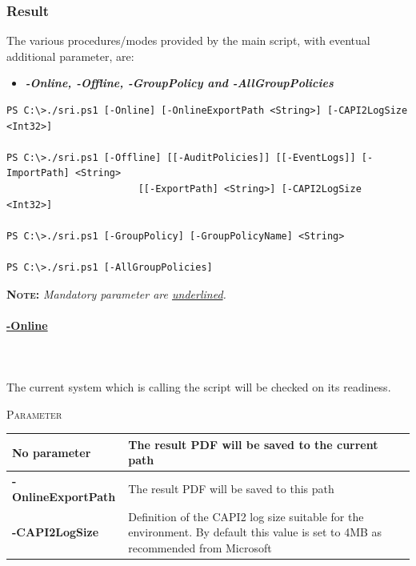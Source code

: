 \subsubsection{Result}
The various procedures/modes provided by the main script, with eventual additional parameter, are:
\begin{itemize}
    \item \textbf{\textit{-Online, -Offline, -GroupPolicy and -AllGroupPolicies}}
\end{itemize}
\begin{lstlisting}[caption=SRI Main Script Parameter Combinations]
PS C:\>./sri.ps1 [-Online] [-OnlineExportPath <String>] [-CAPI2LogSize <Int32>]

PS C:\>./sri.ps1 [-Offline] [[-AuditPolicies]] [[-EventLogs]] [-ImportPath] <String> 
                       [[-ExportPath] <String>] [-CAPI2LogSize <Int32>]

PS C:\>./sri.ps1 [-GroupPolicy] [-GroupPolicyName] <String>

PS C:\>./sri.ps1 [-AllGroupPolicies]
\end{lstlisting}
\vspace{0.5cm}
\textsc{\textbf{Note:}}\textit{ Mandatory parameter are \underline{underlined}.}
\vspace{0.5cm}
\begin{tcolorbox}
    \paragraph{\underline{-Online}} \ \\\\
    The current system which is calling the script will be checked on its readiness.
    \vspace{0.3cm}
    \begin{center}
        \textsc{Parameter}
    \end{center}
    \vspace{-0.5cm}
    \begin{table}[H]
        \def\arraystretch{2}
        \centering
        \begin{tabular}{ p{4cm}  p{10cm} }  \hline
            \textbf{No parameter} & The result PDF will be saved to the current path \\ \hline
            \textbf{-OnlineExportPath} & The result PDF will be saved to this path \\ \hline
            \textbf{-CAPI2LogSize} & Definition of the CAPI2 log size suitable for the environment. By default this value is set to 4MB as recommended from Microsoft \cite{CAPI2} \\ \hline
        \end{tabular}
    \end{table}
\end{tcolorbox}

